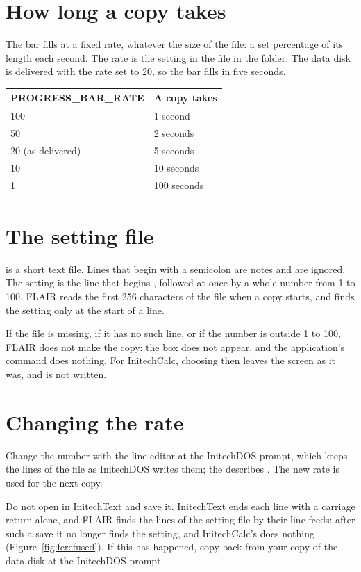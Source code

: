\section{How long a copy takes}
The bar fills at a fixed rate, whatever the size of the file: a set
percentage of its length each second.  The rate is the setting
 in the file  in the
 folder.  The data disk is delivered with the rate set to 20,
so the bar fills in five seconds.
\begin{center}\small
\begin{tabular}{@{}p{38mm}p{40mm}@{}}
\textbf{PROGRESS\_BAR\_RATE} & \textbf{A copy takes}\\\hline
100 & 1 second\\
50 & 2 seconds\\
20 (as delivered) & 5 seconds\\
10 & 10 seconds\\
1 & 100 seconds\\
\end{tabular}
\end{center}

\section{The setting file}
 is a short text file.  Lines that begin with a semicolon
are notes and are ignored.  The setting is the line that begins
, followed at once by a whole number from 1 to
100.  FLAIR reads the first 256 characters of the file when a copy starts,
and finds the setting only at the start of a line.

If the file is missing, if it has no such line, or if the number is outside
1 to 100, FLAIR does not make the copy: the box does not appear, and the
application's command does nothing.  For InitechCalc, choosing
 then leaves the screen as it was, and  is
not written.


\section{Changing the rate}
Change the number with the  line editor at the InitechDOS
prompt, which keeps the lines of the file as InitechDOS writes them; the
 describes .  The new rate is
used for the next copy.

\begin{MacWarning}
Do not open  in InitechText and save it.  InitechText
ends each line with a carriage return alone, and FLAIR finds the lines of
the setting file by their line feeds: after such a save it no longer finds
the setting, and InitechCalc's  does nothing
(Figure~\ref{fig:fcrefused}).  If this has happened, copy 
back from your copy of the data disk at the InitechDOS prompt.
\end{MacWarning}
